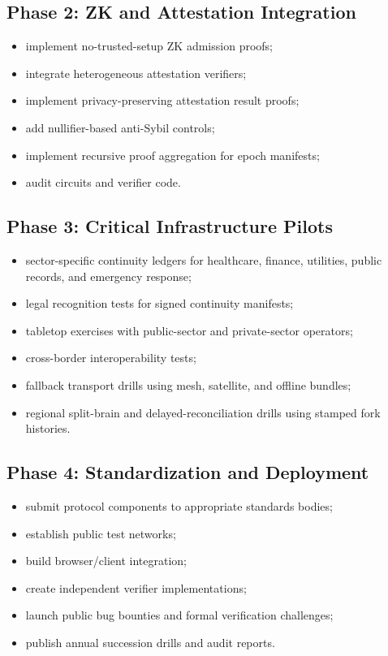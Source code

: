 \documentclass[11pt,letterpaper]{article}
\begin{document}
\subsection{Phase 2: ZK and Attestation Integration}

\begin{itemize}[leftmargin=1.4em]
\item implement no-trusted-setup ZK admission proofs;
\item integrate heterogeneous attestation verifiers;
\item implement privacy-preserving attestation result proofs;
\item add nullifier-based anti-Sybil controls;
\item implement recursive proof aggregation for epoch manifests;
\item audit circuits and verifier code.
\end{itemize}

\subsection{Phase 3: Critical Infrastructure Pilots}

\begin{itemize}[leftmargin=1.4em]
\item sector-specific continuity ledgers for healthcare, finance, utilities, public records, and emergency response;
\item legal recognition tests for signed continuity manifests;
\item tabletop exercises with public-sector and private-sector operators;
\item cross-border interoperability tests;
\item fallback transport drills using mesh, satellite, and offline bundles;
\item regional split-brain and delayed-reconciliation drills using stamped fork histories.
\end{itemize}

\subsection{Phase 4: Standardization and Deployment}

\begin{itemize}[leftmargin=1.4em]
\item submit protocol components to appropriate standards bodies;
\item establish public test networks;
\item build browser/client integration;
\item create independent verifier implementations;
\item launch public bug bounties and formal verification challenges;
\item publish annual succession drills and audit reports.
\end{itemize}
\end{document}
